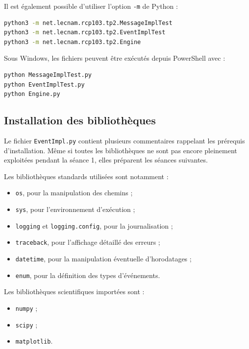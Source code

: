 \documentclass{article}
\begin{document}
Il est également possible d’utiliser l’option \texttt{-m} de Python :

\begin{lstlisting}[language=bash, caption=Exécution sous forme de module]
python3 -m net.lecnam.rcp103.tp2.MessageImplTest
python3 -m net.lecnam.rcp103.tp2.EventImplTest
python3 -m net.lecnam.rcp103.tp2.Engine
\end{lstlisting}

Sous Windows, les fichiers peuvent être exécutés depuis PowerShell avec :

\begin{lstlisting}[language=bash, caption=Exécution sous Windows]
python MessageImplTest.py
python EventImplTest.py
python Engine.py
\end{lstlisting}

\subsection{Installation des bibliothèques}

Le fichier \texttt{EventImpl.py} contient plusieurs commentaires rappelant les prérequis d’installation. Même si toutes les bibliothèques ne sont pas encore pleinement exploitées pendant la séance 1, elles préparent les séances suivantes.

Les bibliothèques standards utilisées sont notamment :
\begin{itemize}[leftmargin=*]
    \item \texttt{os}, pour la manipulation des chemins ;
    \item \texttt{sys}, pour l’environnement d’exécution ;
    \item \texttt{logging} et \texttt{logging.config}, pour la journalisation ;
    \item \texttt{traceback}, pour l’affichage détaillé des erreurs ;
    \item \texttt{datetime}, pour la manipulation éventuelle d’horodatages ;
    \item \texttt{enum}, pour la définition des types d’événements.
\end{itemize}

Les bibliothèques scientifiques importées sont :
\begin{itemize}[leftmargin=*]
    \item \texttt{numpy} ;
    \item \texttt{scipy} ;
    \item \texttt{matplotlib}.
\end{itemize}
\end{document}
